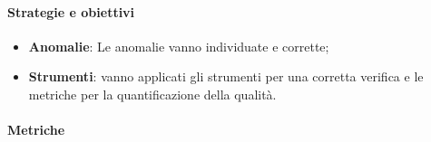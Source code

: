             \paragraph{Strategie e obiettivi}
            \begin{itemize}
                \item \textbf{Anomalie}: Le anomalie vanno individuate e corrette;
                \item \textbf{Strumenti}: vanno applicati gli strumenti per una corretta verifica e le metriche per la quantificazione della qualità.
            \end{itemize}
            
            \paragraph{Metriche}
            
            \hphantom{}
            \def\productquality{
                {   Code coverage,
                    $\frac{Testate}{Totali}$,
                    $ 75 \%$,
                    $ 100 \% $
                },
                {   Numero di test superati,
                    numero intero,
                    = numero totale di test,
                    = numero totale di test
                },
            }
            
